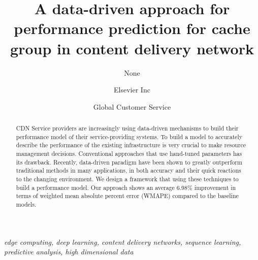 \documentclass[review]{elsarticle}
\begin{document}
\begin{frontmatter}

\title{A data-driven approach for performance prediction for cache group in content delivery network
    }

\author{None
    }
\address{Radarweg 29, Amsterdam}

\author[mymainaddress,mysecondaryaddress]{Elsevier Inc}

\author[mysecondaryaddress]{Global Customer Service}

\address[mymainaddress]{1600 John F Kennedy Boulevard, Philadelphia}
\address[mysecondaryaddress]{360 Park Avenue South, New York}

\begin{abstract}
CDN Service providers are increasingly using data-driven mechanisms to build their performance model of their service-providing systems. To build a model to accurately describe the performance of the existing infrastructure is very crucial to make resource management decisions. Conventional approaches that use hand-tuned parameters has its drawback. Recently, data-driven paradigm have been shown to greatly outperform traditional methods in many applications, in both accuracy and their quick reactions to the changing environment. We design a framework that using these techniques to build a performance model. Our approach shows an average 6.98\% improvement in terms of weighted mean absolute percent error (WMAPE) compared to the baseline models.
\end{abstract}
\begin{keyword}
\textit{edge computing, deep learning, content delivery networks, sequence learning, predictive analysis, high dimensional data}
\end{keyword}
\end{frontmatter}
\linenumbers
\end{document}
